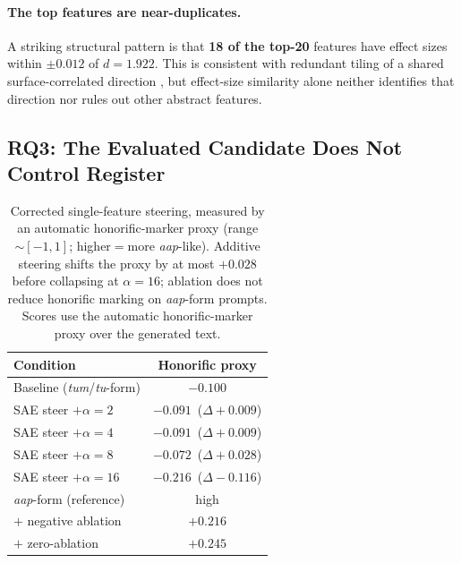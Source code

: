 \documentclass[11pt]{article}
\newcommand{\aap}{\textit{aap}}
\newcommand{\tum}{\textit{tum}}
\newcommand{\tu}{\textit{tu}}
\begin{document}
\paragraph{The top features are near-duplicates.}
A striking structural pattern is that \textbf{18 of the top-20} features have
effect sizes within $\pm0.012$ of $d=1.922$. This is consistent with redundant
tiling of a shared surface-correlated direction
\citep{templeton2024scaling}, but effect-size similarity
alone neither identifies that direction nor rules out other abstract features.

\subsection{RQ3: The Evaluated Candidate Does Not Control Register}
\label{sec:rq3-results}

\begin{table}[t]
\centering
\small
\setlength\tabcolsep{4pt}
\begin{tabular}{lc}
\toprule
\textbf{Condition} & \textbf{Honorific proxy} \\
\midrule
Baseline (\tum/\tu-form)         & $-0.100$ \\
SAE steer $+\alpha{=}2$          & $-0.091$ \,($\Delta{+}0.009$) \\
SAE steer $+\alpha{=}4$          & $-0.091$ \,($\Delta{+}0.009$) \\
SAE steer $+\alpha{=}8$          & $-0.072$ \,($\Delta{+}0.028$) \\
SAE steer $+\alpha{=}16$         & $-0.216$ \,($\Delta{-}0.116$) \\
\midrule
\aap-form (reference)            & high \\
\quad $+$ negative ablation      & $+0.216$ \\
\quad $+$ zero-ablation          & $+0.245$ \\
\bottomrule
\end{tabular}
\caption{Corrected single-feature steering, measured by an automatic
  honorific-marker proxy (range ${\sim}[-1,1]$; higher${=}$more \aap-like).
  Additive steering shifts the proxy by at most $+0.028$ before collapsing at
  $\alpha{=}16$; ablation does not reduce honorific marking on \aap-form prompts.
  Scores use the automatic honorific-marker proxy over the generated text.}
\label{tab:causal}
\end{table}
\end{document}
